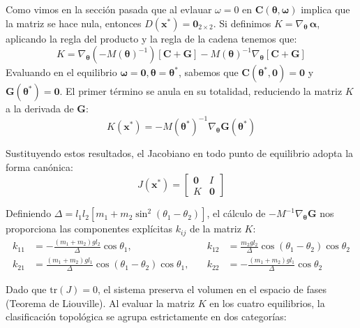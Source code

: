 \documentclass[13pt]{extarticle}
\begin{document}
Como vimos en la sección pasada que al evlauar $ \omega = 0 $ en $\mathbf{C}(\boldsymbol{\theta}, \boldsymbol{\omega})$ implica que la matriz se hace nula, entonces $D(\mathbf{x}^*) = \mathbf{0}_{2\times2}$. Si definimos $K = \nabla_{\boldsymbol{\theta}} \, \boldsymbol{\alpha}$, aplicando la regla del producto y la regla de la cadena tenemos que:
\begin{equation}
    K = \nabla_{\boldsymbol{\theta}} \left( -M(\boldsymbol{\theta})^{-1} \right) [\mathbf{C} + \mathbf{G}] - M(\boldsymbol{\theta})^{-1} \nabla_{\boldsymbol{\theta}} [\mathbf{C} + \mathbf{G}]
\end{equation}
Evaluando en el equilibrio $\boldsymbol{\omega} = \mathbf{0}, \boldsymbol{\theta} = \boldsymbol{\theta}^*$, sabemos que $\mathbf{C}(\boldsymbol{\theta}^*, \mathbf{0}) = \mathbf{0}$ y $\mathbf{G}(\boldsymbol{\theta}^*) = \mathbf{0}$. El primer término se anula en su totalidad, reduciendo la matriz $K$ a la derivada de $\mathbf{G}$:
\begin{equation}
    K(\mathbf{x}^*) = -M(\boldsymbol{\theta}^*)^{-1} \nabla_{\boldsymbol{\theta}} \mathbf{G}(\boldsymbol{\theta}^*)
\end{equation}

Sustituyendo estos resultados, el Jacobiano en todo punto de equilibrio adopta la forma canónica:
\begin{equation}
    J(\mathbf{x}^*) = \begin{bmatrix} \mathbf{0} & I \\ K & \mathbf{0} \end{bmatrix}
\end{equation}

Definiendo $\Delta = l_1 l_2 [m_1 + m_2\sin^2(\theta_1-\theta_2)]$, el cálculo de $-M^{-1} \nabla_{\boldsymbol{\theta}} \mathbf{G}$ nos proporciona las componentes explícitas $k_{ij}$ de la matriz $K$:
\begin{align}
    k_{11} &= -\frac{(m_1+m_2)g l_2}{\Delta} \cos\theta_1, \quad & k_{12} &= \frac{m_2 g l_2}{\Delta} \cos(\theta_1-\theta_2) \cos\theta_2 \\
    k_{21} &= \frac{(m_1+m_2)g l_1}{\Delta} \cos(\theta_1-\theta_2) \cos\theta_1, \quad & k_{22} &= -\frac{(m_1+m_2)g l_1}{\Delta} \cos\theta_2
\end{align}

Dado que $\text{tr}(J) = 0$, el sistema preserva el volumen en el espacio de fases (Teorema de Liouville). Al evaluar la matriz $K$ en los cuatro equilibrios, la clasificación topológica se agrupa estrictamente en dos categorías:
\end{document}
